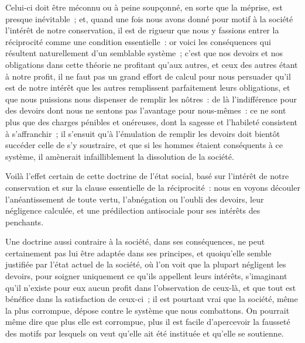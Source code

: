 \documentclass[french,twoside]{book} %
\begin{document}
Celui-ci doit être méconnu ou à peine soupçonné, en sorte que la méprise, est presque inévitable ; et, quand une fois nous avons donné pour motif à la société l’intérêt de notre conservation, il est de rigueur que nous y fassions entrer la réciprocité comme une condition essentielle : or voici les conséquences qui résultent naturellement d’un semblable système ; c’est que nos devoirs et nos obligations dans cette théorie ne profitant qu’aux autres, et ceux des autres étant à notre profit, il ne faut pas un grand effort de calcul pour nous persuader qu’il est de notre intérêt que les autres remplissent parfaitement leurs obligations, et que nous puissions nous dispenser de remplir les nôtres : de là l’indifférence pour des devoirs dont nous ne sentons pas l’avantage pour nous-mêmes : ce ne sont plus que des charges pénibles et onéreuses, dont la sagesse et l’habileté consistent à s’affranchir ; il s’ensuit qu’à l’émulation de remplir les devoirs doit bientôt succéder celle de s’y soustraire, et que si les hommes étaient conséquents à ce système, il amènerait infailliblement la dissolution de la société.\par
Voilà l’effet certain de cette doctrine de l’état social, basé sur l’intérêt de notre conservation et sur la clause essentielle de la réciprocité : nous en voyons découler l’anéantissement de toute vertu, l’abnégation ou l’oubli des devoirs, leur négligence calculée, et une prédilection antisociale pour ses intérêts des penchants.\par
Une doctrine aussi contraire à la société, dans ses conséquences, ne peut certainement pas lui être adaptée dans ses principes, et quoiqu’elle semble justifiée par l’état actuel de la société, où l’on voit que la plupart négligent les devoirs, pour soigner uniquement ce qu’ils appellent leurs intérêts, s’imaginant qu’il n’existe pour eux aucun profit dans l’observation de ceux-là, et que tout est bénéfice dans la satisfaction de ceux-ci ; il est pourtant vrai que la société, même la plus corrompue, dépose contre le système que nous combattons. On pourrait même dire que plus elle est corrompue, plus il est facile d’apercevoir la fausseté des motifs par lesquels on veut qu’elle ait été instituée et qu’elle se soutienne.\par
\end{document}
